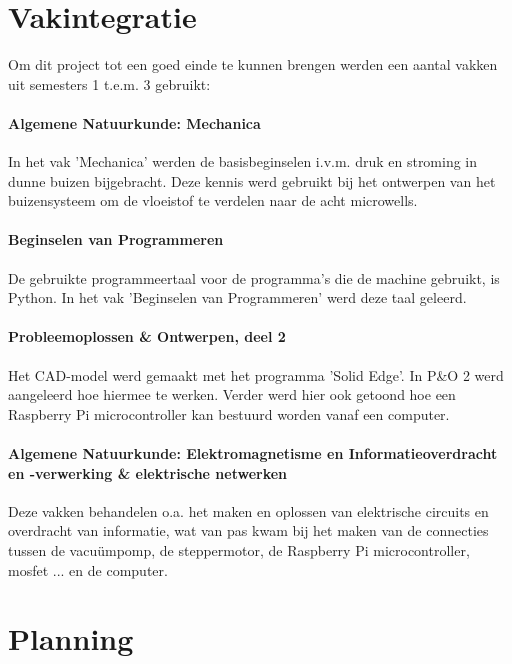 \documentclass[a4paper,twoside,kulak]{kulakreport} %
\begin{document}
\clearpage

\section*{Vakintegratie}
Om dit project tot een goed einde te kunnen brengen werden een aantal vakken uit semesters 1 t.e.m. 3 gebruikt:

\paragraph{Algemene Natuurkunde: Mechanica}

In het vak 'Mechanica' werden de basisbeginselen i.v.m. druk en stroming in dunne buizen bijgebracht. Deze kennis werd gebruikt bij het ontwerpen van het buizensysteem om de vloeistof te verdelen naar de acht microwells.

\paragraph{Beginselen van Programmeren}

De gebruikte programmeertaal voor de programma's die de machine gebruikt, is Python. In het vak 'Beginselen van Programmeren' werd deze taal geleerd. 

\paragraph{Probleemoplossen \& Ontwerpen, deel 2}

Het CAD-model werd gemaakt met het programma 'Solid Edge'. In P\&O 2 werd aangeleerd hoe hiermee te werken. Verder werd hier ook getoond hoe een Raspberry Pi microcontroller kan bestuurd worden vanaf een computer. 

\paragraph{Algemene Natuurkunde: Elektromagnetisme en Informatieoverdracht en -verwerking \& elektrische netwerken}

Deze vakken behandelen o.a. het maken en oplossen van elektrische circuits en overdracht van informatie, wat van pas kwam bij het maken van de connecties tussen de vacuümpomp, de steppermotor, de Raspberry Pi microcontroller, mosfet ... en de computer.

\clearpage

\section*{Planning}
\end{document}
